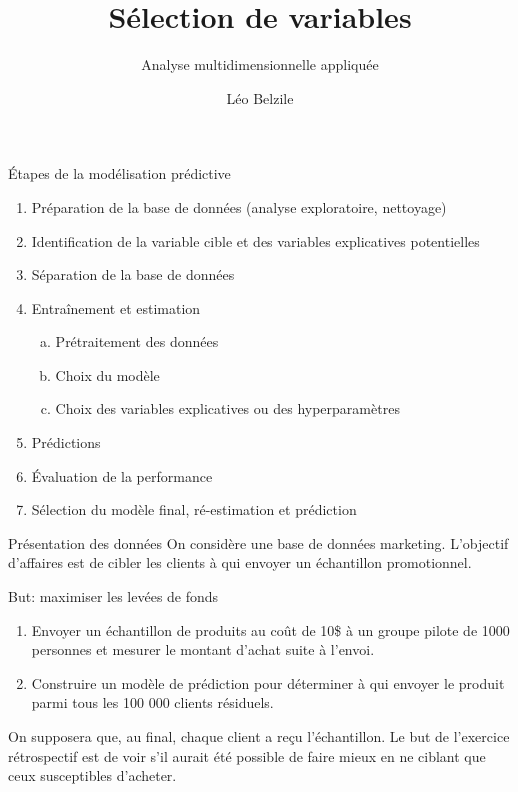 \documentclass[
  ignorenonframetext,
]{beamer}
\title{\texorpdfstring{Sélection de variables}{Sélection de variables}}
\subtitle{\texorpdfstring{Analyse multidimensionnelle
appliquée}{Analyse multidimensionnelle appliquée}}
\author{Léo Belzile}
\date{}
\institute{HEC Montréal}
\providecommand{\tightlist}{%
  \setlength{\itemsep}{0pt}\setlength{\parskip}{0pt}}
\begin{document}
\frame{\titlepage}


\begin{frame}{Étapes de la modélisation prédictive}
\protect{}\label{uxe9tapes-de-la-moduxe9lisation-pruxe9dictive}
\begin{enumerate}
\tightlist
\item
  Préparation de la base de données (analyse exploratoire, nettoyage)
\item
  Identification de la variable cible et des variables explicatives
  potentielles
\item
  Séparation de la base de données
\item
  Entraînement et estimation

  \begin{enumerate}
  [a.]
  \tightlist
  \item
    Prétraitement des données
  \item
    Choix du modèle
  \item
    Choix des variables explicatives ou des hyperparamètres
  \end{enumerate}
\item
  Prédictions
\item
  Évaluation de la performance
\item
  Sélection du modèle final, ré-estimation et prédiction
\end{enumerate}
\end{frame}

\begin{frame}{Présentation des données}
\protect{}\label{pruxe9sentation-des-donnuxe9es}
On considère une base de données marketing. L'objectif d'affaires est de
cibler les clients à qui envoyer un échantillon promotionnel.

But: maximiser les levées de fonds

\begin{enumerate}
\tightlist
\item
  Envoyer un échantillon de produits au coût de 10\$ à un groupe pilote
  de 1000 personnes et mesurer le montant d'achat suite à l'envoi.
\item
  Construire un modèle de prédiction pour déterminer à qui envoyer le
  produit parmi tous les 100 000 clients résiduels.
\end{enumerate}

On supposera que, au final, chaque client a reçu l'échantillon. Le but
de l'exercice rétrospectif est de voir s'il aurait été possible de faire
mieux en ne ciblant que ceux susceptibles d'acheter.
\end{frame}
\end{document}
